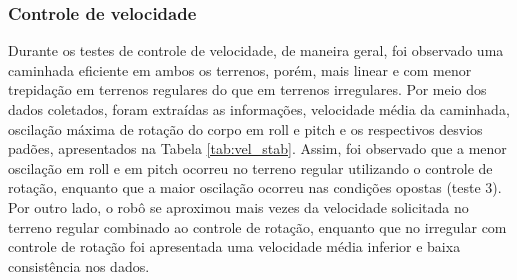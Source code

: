 \documentclass[../main.tex]{subfiles}
\begin{document}
  \subsubsection{Controle de velocidade}
  Durante os testes de controle de velocidade, de maneira geral, foi observado uma caminhada eficiente em ambos os terrenos, porém, mais linear e com menor trepidação em terrenos regulares do que em terrenos irregulares. Por meio dos dados coletados, foram extraídas as informações, velocidade média da caminhada, oscilação máxima de rotação do corpo em roll e pitch e os respectivos desvios padões, apresentados na Tabela \ref{tab:vel_stab}. Assim, foi observado que a menor oscilação em roll e em pitch ocorreu no terreno regular utilizando o controle de rotação, enquanto que a maior oscilação ocorreu nas condições opostas (teste 3).  Por outro lado, o robô se aproximou mais vezes da velocidade solicitada no terreno regular combinado ao controle de rotação, enquanto que no irregular com controle de rotação foi apresentada uma velocidade média inferior e baixa consistência nos dados.
\end{document}
